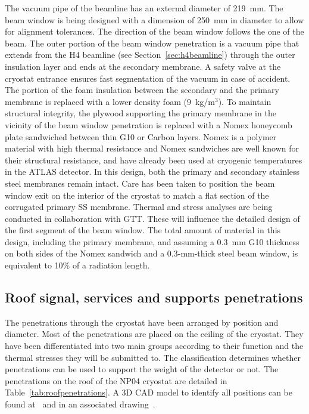   The vacuum pipe of the beamline has an external diameter of 219~mm. The beam window is being designed with a dimension of 250~mm in diameter to allow for alignment tolerances.  The direction of the beam window follows the one of the beam.
The outer portion of the
beam window penetration is a vacuum pipe that extends from the H4 beamline (see Section~\ref{sec:h4beamline})  through the outer insulation layer and ends at the secondary
membrane. A safety valve at the cryostat entrance ensures fast segmentation of the vacuum in case of accident.   The
portion of the foam insulation between the secondary and the primary
membrane is replaced with a lower density foam %
(9~kg/m$^3$).
To maintain structural integrity, the plywood supporting
the primary membrane in the vicinity of the beam window penetration is
replaced with a Nomex honeycomb plate sandwiched between thin G10 or Carbon layers. Nomex is a polymer material with high thermal resistance and Nomex sandwiches are well known for their structural resistance, and have already been used at cryogenic temperatures in the ATLAS detector.
 In this design, both the
primary and secondary stainless steel membranes remain intact. Care has been taken to position the beam window exit on the interior of the cryostat to match a flat section of the corrugated primary SS membrane.
Thermal and stress analyses are being conducted in collaboration with GTT. These will influence the detailed design of the first segment of the beam window. 
The total amount of material in this design, including the primary membrane, and assuming a 0.3~mm G10 thickness on both sides of the Nomex sandwich and a 0.3-mm-thick steel beam window, is equivalent to 10\% of a radiation length. 

\subsection{Roof signal, services and supports penetrations}

The penetrations through the cryostat have been arranged by position and diameter. %
Most of the penetrations are placed on the ceiling of the cryostat. They have been differentiated into two main groups according to their function and the thermal stresses they will be submitted to. The classification determines whether penetrations can be used to support the weight of the detector or not.
The penetrations on the roof of the NP04 cryostat are detailed in Table~\ref{tab:roofpenetrations}.  
A 3D CAD model to identify all positions can be found at~\cite{edms4} and in an associated drawing~\cite{edms5}. 


